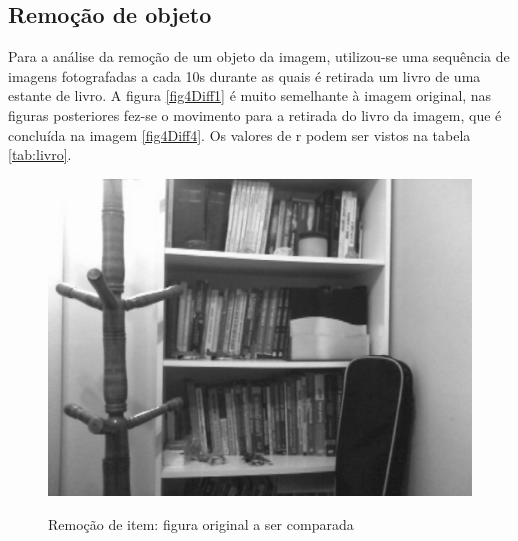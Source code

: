 \documentclass[10pt,a4paper]{article}
\begin{document}
\newpage
\subsection{Remoção de objeto}
Para a análise da remoção de um objeto da imagem, utilizou-se uma
sequência de imagens fotografadas a cada 10s durante as quais é retirada
um livro de uma estante de livro.
A figura \ref{fig4Diff1} é muito semelhante à imagem original, nas
figuras posteriores fez-se o movimento para a retirada do livro da
imagem, que é concluída na imagem \ref{fig4Diff4}.
Os valores de r podem ser vistos na tabela \ref{tab:livro}.

\begin{figure}[h!]
\begin{center}
\includegraphics[scale=0.25]{photos/livros/gBase} \label{livro}
\caption{Remoção de item: figura original a ser comparada}
\end{center}
\end{figure}
\vspace{-0.5cm}
\end{document}
